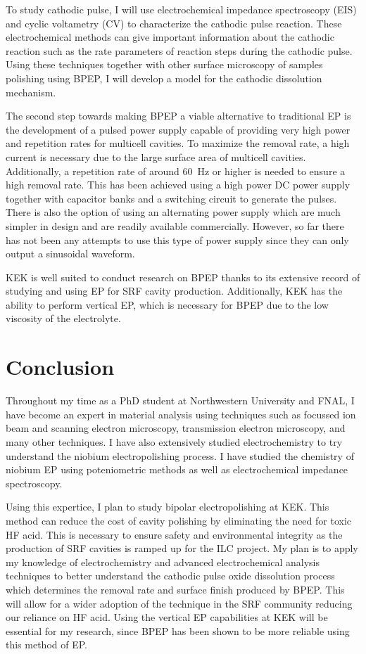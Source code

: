 \documentclass[]{revtex4-2}
\begin{document}
    To study cathodic pulse, I will use electrochemical impedance spectroscopy (EIS) and cyclic voltametry (CV) to characterize the cathodic pulse reaction. These electrochemical methods can give important information about the cathodic reaction such as the rate parameters of reaction steps during the cathodic pulse. Using these techniques together with other surface microscopy of samples polishing using BPEP, I will develop a model for the cathodic dissolution mechanism. 

    The second step towards making BPEP a viable alternative to traditional EP is the development of a pulsed power supply capable of providing very high power and repetition rates for multicell cavities. To maximize the removal rate, a high current is necessary due to the large surface area of multicell cavities. Additionally, a repetition rate of around 60~Hz or higher is needed to ensure a high removal rate. This has been achieved using a high power DC power supply together with capacitor banks and a switching circuit to generate the pulses. There is also the option of using an alternating power supply which are much simpler in design and are readily available commercially. However, so far there has not been any attempts to use this type of power supply since they can only output a sinusoidal waveform. 

    KEK is well suited to conduct research on BPEP thanks to its extensive record of studying and using EP for SRF cavity production. Additionally, KEK has the ability to perform vertical EP, which is necessary for BPEP due to the low viscosity of the electrolyte.

\section{Conclusion}
    
    Throughout my time as a PhD student at Northwestern University and FNAL, I have become an expert in material analysis using techniques such as focussed ion beam and scanning electron microscopy, transmission electron microscopy, and many other techniques. I have also extensively studied electrochemistry to try understand the niobium electropolishing process. I have studied the chemistry of niobium EP using poteniometric methods as well as electrochemical impedance spectroscopy.

    Using this expertice, I plan to study bipolar electropolishing at KEK. This method can reduce the cost of cavity polishing by eliminating the need for toxic HF acid. This is necessary to ensure safety and environmental integrity as the production of SRF cavities is ramped up for the ILC project. My plan is to apply my knowledge of electrochemistry and advanced electrochemical analysis techniques to better understand the cathodic pulse oxide dissolution process which determines the removal rate and surface finish produced by BPEP. This will allow for a wider adoption of the technique in the SRF community reducing our reliance on HF acid. Using the vertical EP capabilities at KEK will be essential for my research, since BPEP has been shown to be more reliable using this method of EP.
    

\newpage



\end{document}
